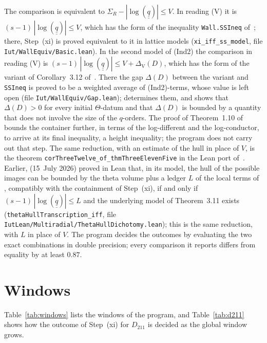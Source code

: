 \documentclass[11pt,a4paper]{article}
\newcommand{\qq}{\underline{\underline{q}}{}}
\begin{document}
The comparison is equivalent to $\Sigma_R-|\log(\qq)|\le V$. In reading (V) it is $(s-1)\,|\log(\qq)|\le V$, which
has the form of the inequality \nolinkurl{Wall.SSIneq} of~\cite{LANAiut}; there, Step~(xi) is proved equivalent to
it in lattice models (\nolinkurl{xi_iff_ss_model}, file \nolinkurl{Iut/WallEquiv/Basic.lean}). In the second
model of (Ind2) the comparison in reading (V) is $(s-1)\,|\log(\qq)|\le V+\Delta_{\mathrm V}(D)$, which has the form of
the variant of Corollary~3.12 of~\cite{LANAiut}. There the gap $\Delta(D)$ between the variant and
\nolinkurl{SSIneq} is proved to be a weighted average of (Ind2)-terms, whose value is left open (file
\nolinkurl{Iut/WallEquiv/Gap.lean}); \cite{Gap} determines them, and shows that $\Delta(D)>0$ for every initial
$\Theta$-datum and that $\Delta(D)$ is bounded by a quantity that does not involve the size of the $q$-orders. The proof of
Theorem~1.10 of~\cite{IUT4} bounds the container further, in terms of the log-different and the log-conductor, to
arrive at its final inequality, a height inequality; the program does not carry out that step. The same reduction,
with an estimate of the hull in place of $V$, is the theorem \nolinkurl{corThreeTwelve_of_thmThreeElevenFive} in the
Lean port of~\cite{Richards}. Earlier, \cite{Takkun} (15~July 2026) proved in Lean that, in its model, the hull of the
possible images can be bounded by the theta volume plus a ledger $L$ of the local terms of
\cite[Props.~1.1--1.4]{IUT4}, compatibly with the containment of Step~(xi), if and only if
$(s-1)\,|\log(\qq)|\le L$ and the underlying model of Theorem~3.11 exists (\nolinkurl{thetaHullTranscription_iff},
file \nolinkurl{IutLean/Multiradial/ThetaHullDichotomy.lean}); this is the same reduction, with $L$ in place of $V$.
The program decides the outcomes by evaluating the two exact combinations in double
precision; every comparison it reports differs from equality by at least $0.87$.

\section{Windows}\label{sec:windows}

Table~\ref{tab:windows} lists the windows of the program, and Table~\ref{tab:d211} shows how the outcome of
Step~(xi) for $D_{211}$ is decided as the global window grows.
\end{document}
